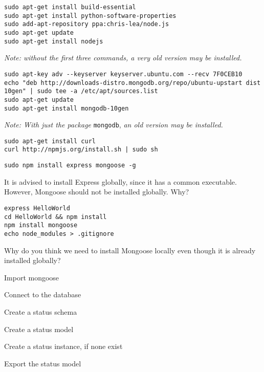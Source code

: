 \documentclass{article}
\begin{document}



\begin{verbatim}
sudo apt-get install build-essential
sudo apt-get install python-software-properties
sudo add-apt-repository ppa:chris-lea/node.js
sudo apt-get update
sudo apt-get install nodejs
\end{verbatim}

\textit{Note: without the first three commands, a very old version may be installed.}


\begin{verbatim}
sudo apt-key adv --keyserver keyserver.ubuntu.com --recv 7F0CEB10
echo "deb http://downloads-distro.mongodb.org/repo/ubuntu-upstart dist 10gen" | sudo tee -a /etc/apt/sources.list
sudo apt-get update
sudo apt-get install mongodb-10gen
\end{verbatim}

\textit{Note: With just the package} \verb!mongodb!, \textit{an old version may be installed.}


\begin{verbatim}
sudo apt-get install curl
curl http://npmjs.org/install.sh | sudo sh
\end{verbatim}



\begin{verbatim}
sudo npm install express mongoose -g
\end{verbatim}

 It is advised to install Express globally, since it has a common executable. However, Mongoose should not be installed globally. Why?


\begin{verbatim}
express HelloWorld
cd HelloWorld && npm install
npm install mongoose
echo node_modules > .gitignore
\end{verbatim}

 Why do you think we need to install Mongoose locally even though it is already installed globally?


\begin{enumerate*}
\item Import mongoose
\item Connect to the database
\item Create a status schema
\item Create a status model
\item Create a status instance, if none exist
\item Export the status model
\end{enumerate*}
\end{document}
